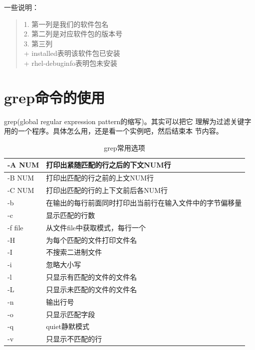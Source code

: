 一些说明：
\begin{quote}
    1. 第一列是我们的软件包名 \\
    2. 第二列是对应软件包的版本号 \\
    3. 第三列 \\
    + installed表明该软件包已安装 \\
    + rhel-debuginfo表明包未安装 
\end{quote}

\section{grep命令的使用}
\label{sec:grepCmd}

grep(global regular expression pattern的缩写)。其实可以把它
理解为过滤关键字用的一个程序。具体怎么用，还是看一个实例吧，然后结束本
节内容。

\begin{table}[!h]
  \centering
  \begin{tabular}{l|l}
    \hline
    -A NUM  & 打印出紧随匹配的行之后的下文NUM行 \\
    \hline
    -B NUM  & 打印出匹配的行之前的上文NUM行 \\
    \hline
    -C NUM  & 打印出匹配的行的上下文前后各NUM行 \\
    \hline
    -b      & 在输出的每行前面同时打印出当前行在输入文件中的字节偏移量 \\
    \hline
    -c      & 显示匹配的行数 \\
    \hline
    -f file & 从文件file中获取模式，每行一个 \\
    \hline
    -H      & 为每个匹配的文件打印文件名 \\
    \hline
    -I      & 不搜索二进制文件 \\
    \hline
    -i      & 忽略大小写 \\
    \hline
    -l      & 只显示有匹配的文件的文件名 \\
    \hline
    -L      & 只显示未匹配的文件的文件名 \\
    \hline
    -n      & 输出行号 \\
    \hline
    -o      & 只显示匹配字段 \\
    \hline
    -q      & quiet静默模式 \\
    \hline
    -v      & 只显示不匹配的行 \\
    \hline
  \end{tabular}
  \caption{grep常用选项}
\end{table}

